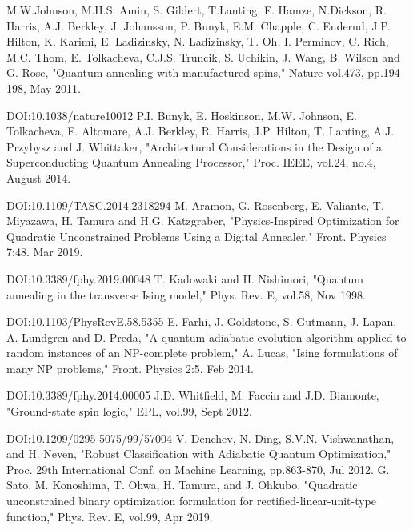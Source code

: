 \documentclass[technicalreport]{ieicej}
\begin{document}
%
%
\begin{thebibliography}{99}%
  M.W.Johnson, M.H.S. Amin, S. Gildert, T.Lanting, F. Hamze, N.Dickson, R. Harris, A.J. Berkley, J. Johansson, P. Bunyk, E.M. Chapple, C. Enderud, J.P. Hilton, K. Karimi, E. Ladizinsky, N. Ladizinsky, T. Oh, I. Perminov, C. Rich, M.C. Thom, E. Tolkacheva, C.J.S. Truncik, S. Uchikin, J. Wang, B. Wilson and G. Rose, "Quantum annealing with manufactured spins," Nature vol.473, pp.194-198, May 2011.
  
  DOI:10.1038/nature10012
  P.I. Bunyk, E. Hoskinson, M.W. Johnson, E. Tolkacheva, F. Altomare, A.J. Berkley, R. Harris, J.P. Hilton, T. Lanting, A.J. Przybysz and J. Whittaker, "Architectural Considerations in the Design of a Superconducting Quantum Annealing Processor," Proc. IEEE, vol.24, no.4, August 2014.
  
  DOI:10.1109/TASC.2014.2318294
  M. Aramon, G. Rosenberg, E. Valiante, T. Miyazawa, H. Tamura and H.G. Katzgraber, "Physics-Inspired Optimization for Quadratic Unconstrained Problems Using a Digital Annealer," Front. Physics 7:48. Mar 2019.
  
  DOI:10.3389/fphy.2019.00048
  T. Kadowaki and H. Nishimori, "Quantum annealing in the transverse Ising model," Phys. Rev. E, vol.58, Nov 1998.
  
  DOI:10.1103/PhysRevE.58.5355
  E. Farhi, J. Goldstone, S. Gutmann, J. Lapan, A. Lundgren and D. Preda, "A quantum adiabatic evolution algorithm applied to random instances of an NP-complete problem,"
  A. Lucas, "Ising formulations of many NP problems," Front. Physics 2:5. Feb 2014.
  
  DOI:10.3389/fphy.2014.00005
  J.D. Whitfield, M. Faccin and J.D. Biamonte, "Ground-state spin logic," EPL, vol.99, Sept 2012.
  
  DOI:10.1209/0295-5075/99/57004
  V. Denchev, N. Ding, S.V.N. Vishwanathan, and H. Neven, "Robust Classification with Adiabatic Quantum Optimization," Proc. 29th International Conf. on Machine Learning, pp.863-870, Jul 2012.
  G. Sato, M. Konoshima, T. Ohwa, H. Tamura, and J. Ohkubo, "Quadratic unconstrained binary optimization formulation for rectified-linear-unit-type function," Phys. Rev. E, vol.99, Apr 2019.
\end{thebibliography}
\end{document}
